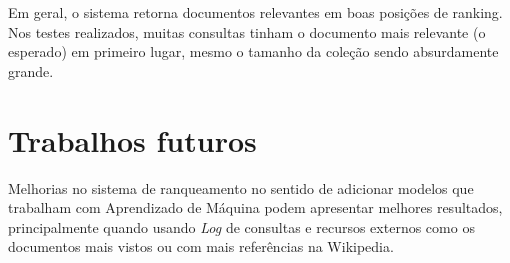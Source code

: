 \documentclass[12pt]{article}
\begin{document}
Em geral, o sistema retorna documentos relevantes em boas posições de ranking. Nos testes realizados, muitas consultas tinham o documento mais relevante (o esperado) em primeiro lugar, mesmo o tamanho da coleção sendo absurdamente grande.

\section{Trabalhos futuros}

Melhorias no sistema de ranqueamento no sentido de adicionar modelos que trabalham com Aprendizado de Máquina podem apresentar melhores resultados, principalmente quando usando \emph{Log} de consultas e recursos externos como os documentos mais vistos ou com mais referências na Wikipedia.



\end{document}
